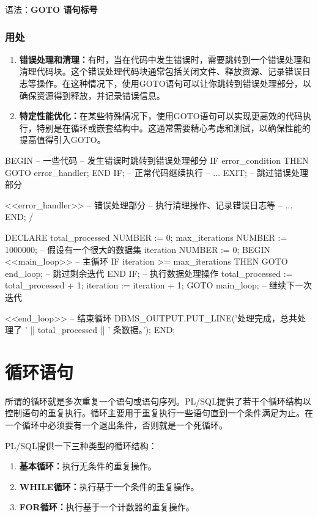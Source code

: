 \documentclass[11pt, a4paper, oneside, UTF8]{ctexbook}
\let\kaishu\relax %
\begin{document}
语法：{\bfseries\kaishu GOTO 语句标号}

\subsection{用处}
\begin{enumerate}
  \item {\bfseries\kaishu 错误处理和清理：}有时，当在代码中发生错误时，需要跳转到一个错误处理和清理代码块。这个错误处理代码块通常包括关闭文件、释放资源、记录错误日志等操作。在这种情况下，使用GOTO语句可以让你跳转到错误处理部分，以确保资源得到释放，并记录错误信息。
  \item {\bfseries\kaishu 特定性能优化：}在某些特殊情况下，使用GOTO语句可以实现更高效的代码执行，特别是在循环或嵌套结构中。这通常需要精心考虑和测试，以确保性能的提高值得引入GOTO。
\end{enumerate}
\begin{plsql}[caption=错误处理示例代码]
BEGIN
  -- 一些代码
  -- 发生错误时跳转到错误处理部分
  IF error_condition THEN
    GOTO error_handler;
  END IF;
  -- 正常代码继续执行
  -- ...
  EXIT; -- 跳过错误处理部分
  
  <<error_handler>> -- 错误处理部分
  -- 执行清理操作、记录错误日志等
  -- ...
END;
/
\end{plsql}

\begin{plsql}[caption=性能提升示例代码（循环）]
DECLARE
  total_processed NUMBER := 0;
  max_iterations NUMBER := 1000000; -- 假设有一个很大的数据集
  iteration NUMBER := 0;
BEGIN
  <<main_loop>> -- 主循环
  IF iteration >= max_iterations THEN
    GOTO end_loop; -- 跳过剩余迭代
  END IF;
  -- 执行数据处理操作
  total_processed := total_processed + 1;
  iteration := iteration + 1;
  GOTO main_loop; -- 继续下一次迭代

  <<end_loop>> -- 结束循环
  DBMS_OUTPUT.PUT_LINE('处理完成，总共处理了 ' || total_processed || ' 条数据。');
END;
\end{plsql}

\chapter{循环语句}
所谓的循环就是多次重复一个语句或语句序列。PL/SQL提供了若干个循环结构以控制语句的重复执行。循环主要用于重复执行一些语句直到一个条件满足为止。在一个循环中必须要有一个退出条件，否则就是一个死循环。

PL/SQL提供一下三种类型的循环结构：
\begin{enumerate}
  \item {\bfseries\kaishu 基本循环：}执行无条件的重复操作。
  \item {\bfseries\kaishu WHILE循环：}执行基于一个条件的重复操作。
  \item {\bfseries\kaishu FOR循环：}执行基于一个计数器的重复操作。
\end{enumerate}
\end{document}
